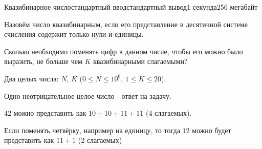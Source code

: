 \begin{problem}{Квазибинарное число}{стандартный ввод}{стандартный вывод}{1 секунда}{256 мегабайт}

Назовём число квазибинарным, если его представление в десятичной системе счисления содержит только нули и единицы.

Сколько необходимо поменять цифр в данном числе, чтобы его можно было выразить, не больше чем $K$ квазибинарными слагаемыми?


\InputFile
Два целых числа: $N$, $K$ ($0 \le N \le 10^6$, $1 \le K \le 20$).


\OutputFile
Одно неотрицательное целое число - ответ на задачу.

\Example

\begin{example}
%
\end{example}

\Note
$42$ можно представить как $10 + 10 + 11 + 11$ (4 слагаемых).

Если поменять четвёрку, например на единицу, то тогда $12$ можно будет представить как $11 + 1$ (2 слагаемых)


\end{problem}

